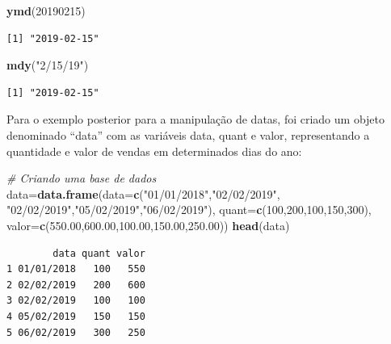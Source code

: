\documentclass[12pt,brazil,oneside]{book}
\newenvironment{Shaded}{\begin{snugshade}}{\end{snugshade}}
\newcommand{\CommentTok}[1]{\textcolor[rgb]{0.56,0.35,0.01}{\textit{#1}}}
\newcommand{\DataTypeTok}[1]{\textcolor[rgb]{0.13,0.29,0.53}{#1}}
\newcommand{\DecValTok}[1]{\textcolor[rgb]{0.00,0.00,0.81}{#1}}
\newcommand{\FloatTok}[1]{\textcolor[rgb]{0.00,0.00,0.81}{#1}}
\newcommand{\KeywordTok}[1]{\textcolor[rgb]{0.13,0.29,0.53}{\textbf{#1}}}
\newcommand{\NormalTok}[1]{#1}
\newcommand{\StringTok}[1]{\textcolor[rgb]{0.31,0.60,0.02}{#1}}
\begin{document}
\begin{Shaded}
\begin{Highlighting}[]
\KeywordTok{ymd}\NormalTok{(}\DecValTok{20190215}\NormalTok{)}
\end{Highlighting}
\end{Shaded}

\begin{verbatim}
[1] "2019-02-15"
\end{verbatim}

\begin{Shaded}
\begin{Highlighting}[]
\KeywordTok{mdy}\NormalTok{(}\StringTok{"2/15/19"}\NormalTok{)}
\end{Highlighting}
\end{Shaded}

\begin{verbatim}
[1] "2019-02-15"
\end{verbatim}

Para o exemplo posterior para a manipulação de datas, foi criado um objeto denominado ``data'' com as variáveis data, quant e valor, representando a quantidade e valor de vendas em determinados dias do ano:

\begin{Shaded}
\begin{Highlighting}[]
\CommentTok{# Criando uma base de dados}
\NormalTok{data=}\KeywordTok{data.frame}\NormalTok{(}\DataTypeTok{data=}\KeywordTok{c}\NormalTok{(}\StringTok{"01/01/2018"}\NormalTok{,}\StringTok{"02/02/2019"}\NormalTok{,}
                       \StringTok{"02/02/2019"}\NormalTok{,}\StringTok{"05/02/2019"}\NormalTok{,}\StringTok{"06/02/2019"}\NormalTok{),}
                \DataTypeTok{quant=}\KeywordTok{c}\NormalTok{(}\DecValTok{100}\NormalTok{,}\DecValTok{200}\NormalTok{,}\DecValTok{100}\NormalTok{,}\DecValTok{150}\NormalTok{,}\DecValTok{300}\NormalTok{),}
                \DataTypeTok{valor=}\KeywordTok{c}\NormalTok{(}\FloatTok{550.00}\NormalTok{,}\FloatTok{600.00}\NormalTok{,}\FloatTok{100.00}\NormalTok{,}\FloatTok{150.00}\NormalTok{,}\FloatTok{250.00}\NormalTok{))}
\KeywordTok{head}\NormalTok{(data)}
\end{Highlighting}
\end{Shaded}

\begin{verbatim}
        data quant valor
1 01/01/2018   100   550
2 02/02/2019   200   600
3 02/02/2019   100   100
4 05/02/2019   150   150
5 06/02/2019   300   250
\end{verbatim}
\end{document}
